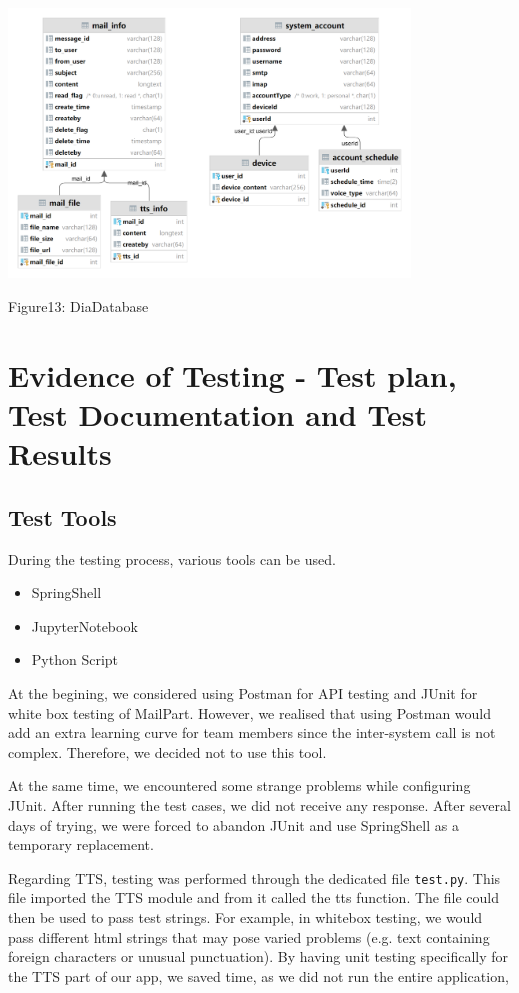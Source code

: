 \documentclass{article}
\begin{document}
\includegraphics[width=0.8\textwidth]{DiaDatabase.png}
\begin{center}
Figure13: DiaDatabase
\end{center}


\section{Evidence of Testing - Test plan, Test Documentation and Test Results}
\subsection{Test Tools}
During the testing process, various tools can be used.
\begin{itemize}
\item SpringShell
\item JupyterNotebook
\item Python Script
\end{itemize}
At the begining, we considered using Postman for API testing and JUnit for white box testing of MailPart. However, we realised that using Postman would add an extra learning curve for team members since the inter-system call is not complex. Therefore, we decided not to use this tool.

At the same time, we encountered some strange problems while configuring JUnit. After running the test cases, we did not receive any response. After several days of trying, we were forced to abandon JUnit and use SpringShell as a temporary replacement.

Regarding TTS, testing was performed through the dedicated file \texttt{test.py}. This file imported the TTS module and from it called the tts function. The file could then be used to pass test strings. For example, in whitebox testing, we would pass different html strings that may pose varied problems (e.g. text containing foreign characters or unusual punctuation). By having unit testing specifically for the TTS part of our app, we saved time, as we did not run the entire application,
\end{document}
